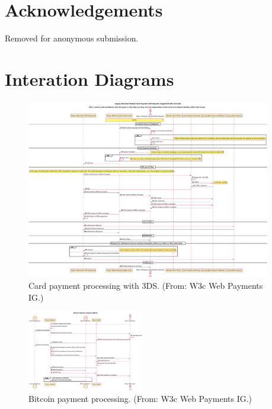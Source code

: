 \documentclass{IEEEtran}
\begin{document}
\section*{Acknowledgements}

Removed for anonymous submission.




\appendix
\section{Interation Diagrams}

\begin{figure}[h!]
\begin{center}
\includegraphics[width=0.95\textwidth]{figs/cc3ds.pdf}
\end{center}
\caption{Card payment processing with 3DS. (From: W3c Web Payments IG.)}
\label{fig:cc3ds}
\end{figure}



\begin{figure}[h!]
\includegraphics[width=0.45\textwidth]{figs/bitcoin.pdf}
\caption{Bitcoin payment processing. (From: W3c Web Payments IG.)}
\label{fig:bitcoin}
\end{figure}
\end{document}
